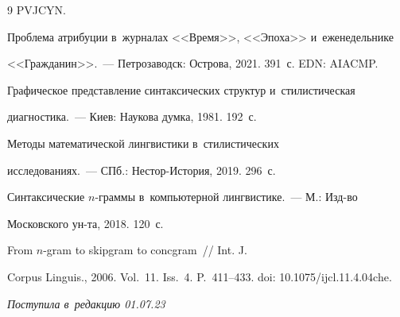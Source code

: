 {{\begin{thebibliography}{9}
PVJCYN. 









Проб\-ле\-ма атрибуции в~журналах <<Время>>, <<Эпоха>> и~еженедельнике 


<<Гражданин>>.~--- Петрозаводск: Острова, 2021. 391~с. EDN: AIACMP.







 Графическое представление синтаксических структур и~стилистическая 


диагностика.~--- Киев: Наукова думка, 1981. 192~с.




 Методы математической лингвистики в~стилистических 


исследованиях.~--- СПб.: Нестор-История, 2019. 296~с.




 Синтаксические $n$-грам\-мы в~компьютерной лингвистике.~--- М.: Изд-во 


Московского ун-та, 2018. 120~с.




 From $n$-gram to skipgram to concgram~/\!\!/ Int. J. 


Corpus Linguis., 2006. Vol.~11. Iss.~4. P.~411--433. doi: 10.1075\!/\!ijcl.11.4.04che.





   \end{thebibliography}


} }











\vspace*{-6pt}





\hfill{\small\textit{Поступила в~редакцию 01.07.23}}





